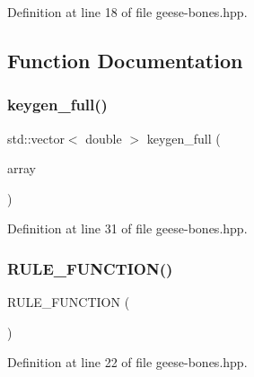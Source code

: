 Definition at line 18 of file geese-\/bones.\+hpp.



\subsection{Function Documentation}
\mbox{\label{geese-bones_8hpp_aa60134cca317d64e4b3d1707380d5d0d}} 
\subsubsection{\texorpdfstring{keygen\+\_\+full()}{keygen\_full()}}
{\footnotesize\ttfamily std\+::vector$<$ double $>$ keygen\+\_\+full (\begin{DoxyParamCaption}\item[{const \hyperlink{namespacebarry_1_1counters_1_1phylo_abd293bf65e494e903639fb5fb2c91604}{phylocounters\+::\+Phylo\+Array} \&}]{array }\end{DoxyParamCaption})\hspace{0.3cm}{\ttfamily [inline]}}



Definition at line 31 of file geese-\/bones.\+hpp.

\mbox{\label{geese-bones_8hpp_a11c7dd7dca27f32547bb602f30ceb5e8}} 
\subsubsection{\texorpdfstring{R\+U\+L\+E\+\_\+\+F\+U\+N\+C\+T\+I\+O\+N()}{RULE\_FUNCTION()}}
{\footnotesize\ttfamily R\+U\+L\+E\+\_\+\+F\+U\+N\+C\+T\+I\+ON (\begin{DoxyParamCaption}\item[{rule\+\_\+empty\+\_\+free}]{ }\end{DoxyParamCaption})}



Definition at line 22 of file geese-\/bones.\+hpp.

\mbox{\label{geese-bones_8hpp_ac4e3e3e3920b3bbde57ac1ed395e9983}} 
